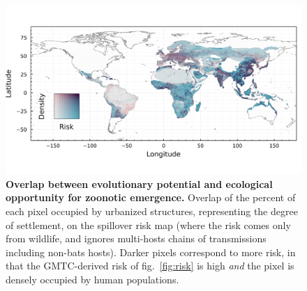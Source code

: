 \documentclass[11pt]{article}
\makeatletter
\def\maxwidth{\ifdim\Gin@nat@width>\linewidth\linewidth
\else\Gin@nat@width\fi}
\let\Oldincludegraphics\includegraphics
\renewcommand{\includegraphics}[1]{\Oldincludegraphics[width=\maxwidth]{#1}}
\makeatother
\begin{document}
\begin{figure}
\hypertarget{fig:compound}{%
\centering
\includegraphics{figures/risk_compounded.png}
\caption{\textbf{Overlap between evolutionary potential and ecological
opportunity for zoonotic emergence.} Overlap of the percent of each
pixel occupied by urbanized structures, representing the degree of
settlement, on the spillover risk map (where the risk comes only from
wildlife, and ignores multi-hosts chains of transmissions including
non-bats hosts). Darker pixels correspond to more risk, in that the
GMTC-derived risk of fig.~\ref{fig:risk} is high \emph{and} the pixel is
densely occupied by human populations.}\label{fig:compound}
}
\end{figure}
\end{document}
